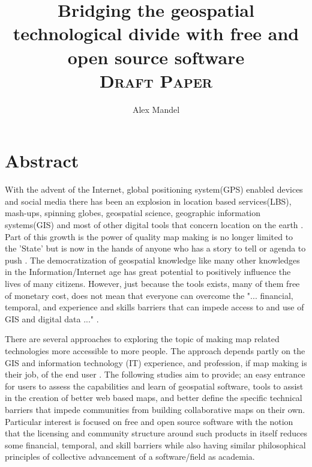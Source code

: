 \documentclass[12pt,letterpaper]{article}
\author{Alex Mandel}
\title{Bridging the geospatial technological divide with free and open source software
\\	
\textsc{\small Draft Paper}\\[0.5cm]
}
\begin{document}
\maketitle
\tableofcontents
\onehalfspace
\section{Abstract}

	With the advent of the Internet, global positioning system(GPS) enabled devices and social media there has been an explosion in location based services(LBS), mash-ups, spinning globes, geospatial science, geographic information systems(GIS) and most of other digital tools that concern location on the earth \parencite{Tate2009}. Part of this growth is the power of quality map making is no longer limited to the 'State' but is now in the hands of anyone who has a story to tell or agenda to push \parencite{Wood2010}. The democratization of geospatial knowledge like many other knowledges in the Information/Internet age has great potential to positively influence the lives of many citizens. However, just because the tools exists, many of them free of monetary cost, does not mean that everyone can overcome the "... financial, temporal, and experience and skills barriers that can impede access to and use of GIS and digital data ..." \parencite{Elwood2006}. 


	There are several approaches to exploring the topic of making map related technologies more accessible to more people. The approach depends partly on the GIS and information technology (IT) experience, and profession, if map making is their job, of the end user \parencite{Donnelly2010}. The following studies aim to provide; an easy entrance for users to assess the capabilities and learn of geospatial software, tools to assist in the creation of better web based maps, and better define the specific technical barriers that impede communities from building collaborative maps on their own. Particular interest is focused on free and open source software\parencite{Lindberg2008} with the notion that the licensing and community structure around such products in itself reduces some financial, temporal, and skill barriers while also having similar philosophical principles of collective advancement of a software/field as academia. 
\end{document}
